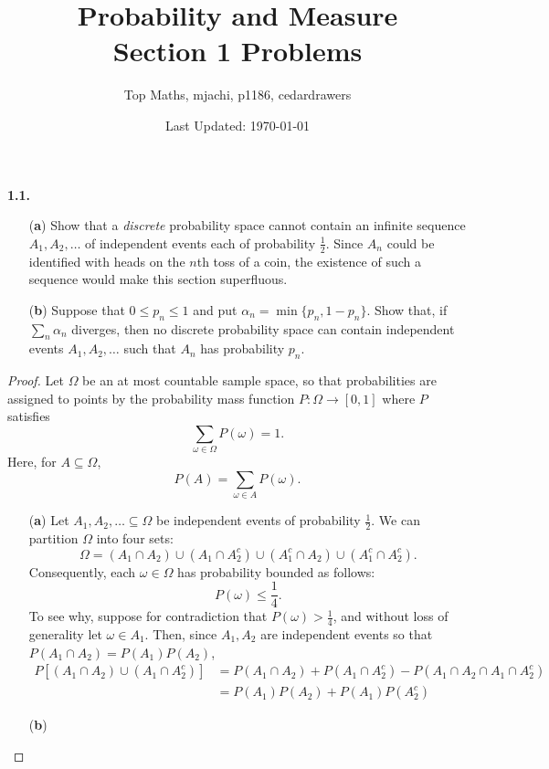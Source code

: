 \documentclass[12pt]{article}
\title{Probability and Measure \\ Section 1 Problems}
\date{Last Updated: \today}
\author{Top Maths, mjachi, p1186, cedardrawers}
\theoremstyle{definition}
\begin{document}
	\maketitle 

\noindent \textbf{1.1.} ~
\begin{itemize}
	\item[(\textbf{a})] Show that a \textit{discrete} probability space cannot contain an infinite sequence $A_1, A_2, \dots$ of independent events each of probability $\frac{1}{2}$. Since $A_n$ could be identified with heads on the $n$th toss of a coin, the existence of such a sequence would make this section superfluous. 
	
	\item[(\textbf{b})] Suppose that $0 \leq p_n \leq 1$ and put $\alpha_n = \min \{p_n, 1 - p_n\}$. Show that, if $\sum_n \alpha_n$ diverges, then no discrete probability space can contain independent events $A_1, A_2, \dots$ such that $A_n$ has probability $p_n$. 
\end{itemize} 	 
	\begin{proof} Let $\Omega$ be an at most countable sample space, so that probabilities are assigned to points by the probability mass function $P: \Omega \to [0, 1]$ where $P$ satisfies $$\sum_{\omega \in \Omega} P(\omega) = 1.$$ Here, for $A \subseteq \Omega$, $$P(A) = \sum_{\omega \in A} P(\omega).$$
		\begin{itemize}
			\item[(\textbf{a})] Let $A_1, A_2, \dots \subseteq \Omega$ be independent events of probability $\frac{1}{2}$. We can partition $\Omega$ into four sets: $$\Omega = \left(A_1 \cap A_2\right) \cup \left(A_1 \cap A_2^c\right) \cup \left(A_1^c \cap A_2\right) \cup \left(A_1^c \cap A_2^c\right).$$ Consequently, each $\omega \in \Omega$ has probability bounded as follows: $$P(\omega) \leq \frac{1}{4}.$$ To see why, suppose for contradiction that $P(\omega) > \frac{1}{4}$, and without loss of generality let $\omega \in A_1$. Then, since $A_1, A_2$ are independent events so that $P(A_1 \cap A_2) = P(A_1) P(A_2)$, 
				\begin{align*}
					P\left[\left(A_1 \cap A_2\right) \cup \left(A_1 \cap A_2^c\right)\right] &= P(A_1 \cap A_2) + P(A_1 \cap A_2^c) - P(A_1 \cap A_2 \cap A_1 \cap A_2^c) \\
					&= P(A_1)P(A_2) + P(A_1)P(A_2^c)
				\end{align*}
			
			\item[(\textbf{b})]
		\end{itemize}
	\end{proof}
\end{document}
